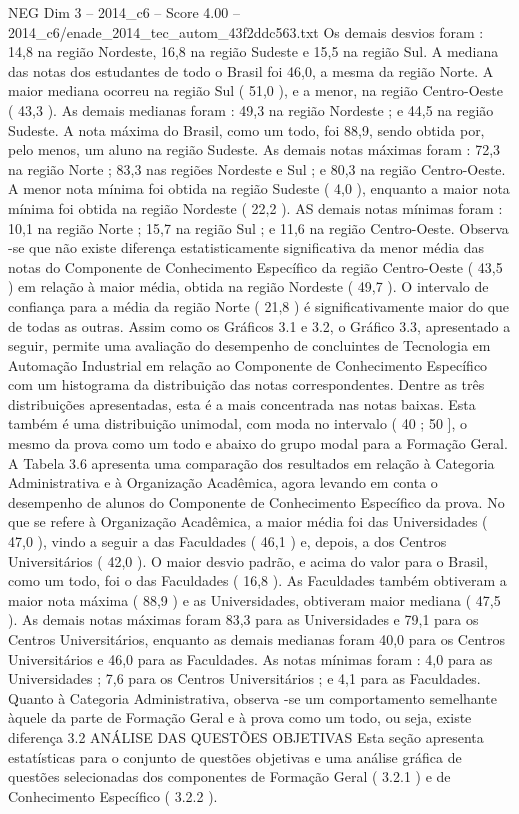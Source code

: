\begin{textsample}{NEG Dim 3 – 2014\_c6 – Score 4.00 – 2014\_c6/enade\_2014\_tec\_autom\_43f2ddc563.txt}
Os demais desvios foram : 14,8 na região Nordeste, 16,8 na região Sudeste e 15,5 na região Sul.
A mediana das notas dos estudantes de todo o Brasil foi 46,0, a mesma da região Norte.
A maior mediana ocorreu na região Sul ( 51,0 ), e a menor, na região Centro-Oeste ( 43,3 ).
As demais medianas foram : 49,3 na região Nordeste ; e 44,5 na região Sudeste.
A nota máxima do Brasil, como um todo, foi 88,9, sendo obtida por, pelo menos, um aluno na região Sudeste.
As demais notas máximas foram : 72,3 na região Norte ; 83,3 nas regiões Nordeste e Sul ; e 80,3 na região Centro-Oeste.
A menor nota mínima foi obtida na região Sudeste ( 4,0 ), enquanto a maior nota mínima foi obtida na região Nordeste ( 22,2 ).
AS demais notas mínimas foram : 10,1 na região Norte ; 15,7 na região Sul ; e 11,6 na região Centro-Oeste.
Observa -se que não existe diferença estatisticamente significativa da menor média das notas do Componente de Conhecimento Específico da região Centro-Oeste ( 43,5 ) em relação à maior média, obtida na região Nordeste ( 49,7 ).
O intervalo de confiança para a média da região Norte ( 21,8 ) é significativamente maior do que de todas as outras.
Assim como os Gráficos 3.1 e 3.2, o Gráfico 3.3, apresentado a seguir, permite uma avaliação do desempenho de concluintes de Tecnologia em Automação Industrial em relação ao Componente de Conhecimento Específico com um histograma da distribuição das notas correspondentes.
Dentre as três distribuições apresentadas, esta é a mais concentrada nas notas baixas.
Esta também é uma distribuição unimodal, com moda no intervalo ( 40 ; 50 ], o mesmo da prova como um todo e abaixo do grupo modal para a Formação Geral.
A Tabela 3.6 apresenta uma comparação dos resultados em relação à Categoria Administrativa e à Organização Acadêmica, agora levando em conta o desempenho de alunos do Componente de Conhecimento Específico da prova.
No que se refere à Organização Acadêmica, a maior média foi das Universidades ( 47,0 ), vindo a seguir a das Faculdades ( 46,1 ) e, depois, a dos Centros Universitários ( 42,0 ).
O maior desvio padrão, e acima do valor para o Brasil, como um todo, foi o das Faculdades ( 16,8 ).
As Faculdades também obtiveram a maior nota máxima ( 88,9 ) e as Universidades, obtiveram maior mediana ( 47,5 ).
As demais notas máximas foram 83,3 para as Universidades e 79,1 para os Centros Universitários, enquanto as demais medianas foram 40,0 para os Centros Universitários e 46,0 para as Faculdades.
As notas mínimas foram : 4,0 para as Universidades ; 7,6 para os Centros Universitários ; e 4,1 para as Faculdades.
Quanto à Categoria Administrativa, observa -se um comportamento semelhante àquele da parte de Formação Geral e à prova como um todo, ou seja, existe diferença 3.2 ANÁLISE DAS QUESTÕES OBJETIVAS Esta seção apresenta estatísticas para o conjunto de questões objetivas e uma análise gráfica de questões selecionadas dos componentes de Formação Geral ( 3.2.1 ) e de Conhecimento Específico ( 3.2.2 ).

\end{textsample}
